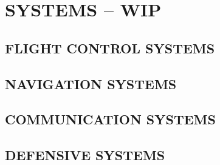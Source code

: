 \chapter{SYSTEMS -- WIP}
\localtableofcontents
\cleardoublepage

\section{FLIGHT CONTROL SYSTEMS} 

\clearpage

\section{NAVIGATION SYSTEMS}

\clearpage

\section{COMMUNICATION SYSTEMS}

\clearpage

\section{DEFENSIVE SYSTEMS}

\clearpage

\cleardoublepage